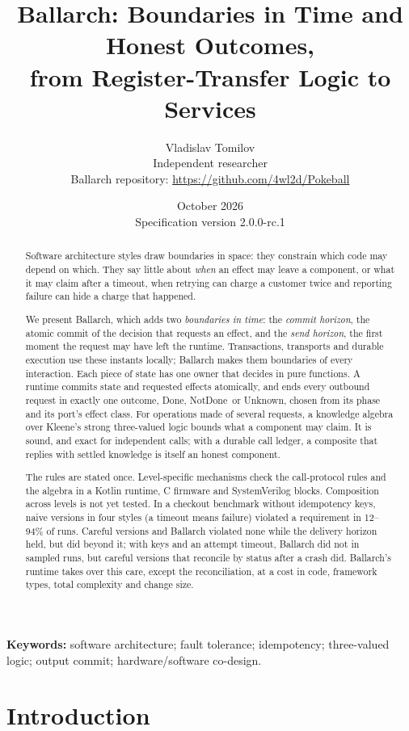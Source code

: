 \documentclass[11pt]{article}
\title{Ballarch: Boundaries in Time and Honest Outcomes,\\from Register-Transfer Logic to Services}
\author{Vladislav Tomilov\\Independent researcher\\[2pt]\small Ballarch repository: \url{https://github.com/4wl2d/Pokeball}}
\date{October 2026\\\small Specification version 2.0.0-rc.1}
\theoremstyle{definition}
\theoremstyle{plain}
\newcommand{\Done}{\textsf{Done}}
\newcommand{\NotDone}{\textsf{NotDone}}
\newcommand{\Unknown}{\textsf{Unknown}}
\begin{document}
\maketitle

\begin{abstract}
Software architecture styles draw boundaries in space: they constrain which code may depend on which. They say little about \emph{when} an effect may leave a component, or what it may claim after a timeout, when retrying can charge a customer twice and reporting failure can hide a charge that happened.

We present Ballarch, which adds two \emph{boundaries in time}: the \emph{commit horizon}, the atomic commit of the decision that requests an effect, and the \emph{send horizon}, the first moment the request may have left the runtime. Transactions, transports and durable execution use these instants locally; Ballarch makes them boundaries of every interaction. Each piece of state has one owner that decides in pure functions. A runtime commits state and requested effects atomically, and ends every outbound request in exactly one outcome, \Done, \NotDone\ or \Unknown, chosen from its phase and its port's effect class. For operations made of several requests, a knowledge algebra over Kleene's strong three-valued logic bounds what a component may claim. It is sound, and exact for independent calls; with a durable call ledger, a composite that replies with settled knowledge is itself an honest component.

The rules are stated once. Level-specific mechanisms check the call-protocol rules and the algebra in a Kotlin runtime, C firmware and SystemVerilog blocks. Composition across levels is not yet tested. In a checkout benchmark without idempotency keys, naive versions in four styles (a timeout means failure) violated a requirement in 12--94\% of runs. Careful versions and Ballarch violated none while the delivery horizon held, but did beyond it; with keys and an attempt timeout, Ballarch did not in sampled runs, but careful versions that reconcile by status after a crash did. Ballarch's runtime takes over this care, except the reconciliation, at a cost in code, framework types, total complexity and change size.
\end{abstract}

\noindent\textbf{Keywords:} software architecture; fault tolerance; idempotency; three-valued logic; output commit; hardware/software co-design.

\section{Introduction}
\end{document}
